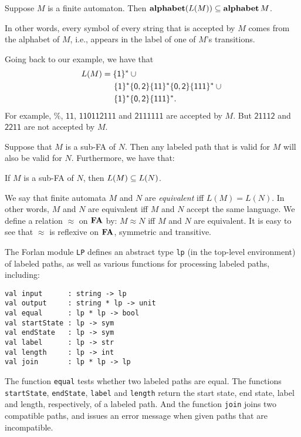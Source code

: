 \begin{proposition}
Suppose $M$ is a finite automaton.  Then $\mathbf{alphabet}(L(M))\subseteq\mathbf{alphabet}\,M$.
\end{proposition}

In other words, every symbol of every string that is accepted by $M$
comes from the alphabet of $M$, i.e., appears in the label of one of
$M$'s transitions.

Going back to our example, we have that
\begin{align*}
L(M) &= \{\mathsf{1}\}^* \cup {}\\
     &\quad\;\,\mathsf{\{1\}^*\{0,2\}\{11\}^*\{0,2\}\{111\}^*} \cup {} \\
     &\quad\;\,\mathsf{\{1\}^*\{0,2\}\{111\}^*} .
\end{align*}
For example, $\%$, $\mathsf{11}$, $\mathsf{110112111}$ and
$\mathsf{2111111}$ are accepted by $M$.  But $\mathsf{21112}$ and
$\mathsf{2211}$ are not accepted by $M$.

Suppose that $M$ is a sub-FA of $N$.  Then any labeled path that is
valid for $M$ will also be valid for $N$.  Furthermore, we have that:

\begin{proposition}
If $M$ is a sub-FA of $N$, then $L(M)\subseteq L(N)$.
\end{proposition}

%
%
%
We say that finite automata $M$ and $N$ are \emph{equivalent} iff
$L(M) = L(N)$.  In other words, $M$ and $N$ are equivalent iff $M$ and
$N$ accept the same language.  We define a relation $\approx$ on $\mathbf{FA}$
by: $M\approx N$ iff $M$ and $N$ are equivalent.  It is easy to see
that $\approx$ is reflexive on $\mathbf{FA}$, symmetric and transitive.

The Forlan module \texttt{LP} defines an abstract type \texttt{lp} (in the
top-level environment) of labeled paths, as well as various functions
for processing labeled paths, including:
\begin{verbatim}
val input      : string -> lp
val output     : string * lp -> unit
val equal      : lp * lp -> bool
val startState : lp -> sym
val endState   : lp -> sym
val label      : lp -> str
val length     : lp -> int
val join       : lp * lp -> lp
\end{verbatim}
%
%
%
%
%
%
%
%
The function \texttt{equal} tests whether two labeled paths are
equal.  The functions \texttt{startState}, \texttt{endState},
\texttt{label} and \texttt{length} return the start state, end
state, label and length, respectively, of a labeled path.  And
the function \texttt{join} joins two compatible paths, and issues
an error message when given paths that are incompatible.


